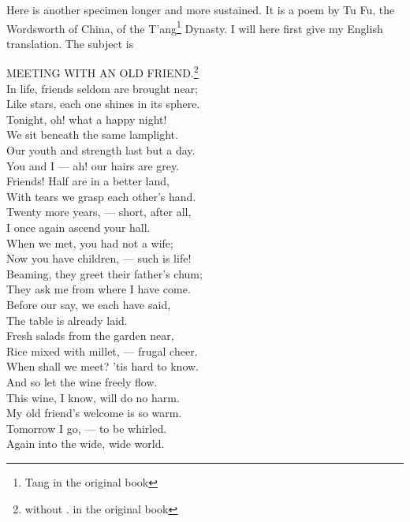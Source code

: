 Here is another specimen longer and more sustained.
It is a poem by Tu Fu,  the Wordsworth of China, of the T'ang\footnote{Tang in the original book} Dynasty.
I will here first give my English translation.
The subject is
\begin{center}
    MEETING WITH AN OLD FRIEND.\footnote{without . in the original book} \\
   In life, friends seldom are brought near; \\
   Like stars, each one shines in its sphere. \\
   Tonight, oh! what a happy night! \\
   We sit beneath the same lamplight. \\
   Our youth and strength last but a day. \\
   You and I --- ah! our hairs are grey. \\
   Friends! Half are in a better land, \\
   With tears we grasp each other's hand. \\
   Twenty more years, --- short, after all, \\
   I once again ascend your hall. \\
   When we met, you had not a wife; \\
   Now you have children, --- such is life! \\
   Beaming, they greet their father's chum; \\
   They ask me from where I have come. \\
   Before our say, we each have said, \\
   The table is already laid. \\
   Fresh salads from the garden near, \\
   Rice mixed with millet, --- frugal cheer. \\
   When shall we meet? 'tis hard to know. \\
   And so let the wine freely flow. \\
   This wine, I know, will do no harm. \\
   My old friend's welcome is so warm. \\
   Tomorrow I go, --- to be whirled. \\
   Again into the wide, wide world.
\end{center}

